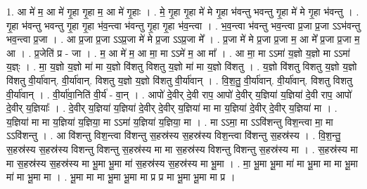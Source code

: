\documentclass[17pt]{extarticle}
\begin{document}
1. आ मे॑ म॒ आ मे॑ गृ॒हा गृ॒हा म॒ आ मे॑ गृ॒हाः । . मे॒ गृ॒हा गृ॒हा मे॑ मे गृ॒हा भ॑वन्तु भवन्तु गृ॒हा मे॑ मे गृ॒हा भ॑वन्तु । . गृ॒हा भ॑वन्तु भवन्तु गृ॒हा गृ॒हा भ॑व॒न्त्वा भ॑वन्तु गृ॒हा गृ॒हा भ॑व॒न्त्वा । . भ॒व॒न्त्वा भ॑वन्तु भव॒न्त्वा प्र॒जा प्र॒जा ऽऽभ॑वन्तु भव॒न्त्वा प्र॒जा । . आ प्र॒जा प्र॒जा ऽऽप्र॒जा मे॑ मे प्र॒जा ऽऽप्र॒जा मे᳚ । . प्र॒जा मे॑ मे प्र॒जा प्र॒जा म॒ आ मे᳚ प्र॒जा प्र॒जा म॒ आ । . प्र॒जेति॑ प्र - जा । . म॒ आ मे॑ म॒ आ मा॒ मा ऽऽमे॑ म॒ आ मा᳚ । . आ मा॒ मा ऽऽमा॑ य॒ज्ञो य॒ज्ञो मा ऽऽमा॑ य॒ज्ञ्ः । . मा॒ य॒ज्ञो य॒ज्ञो मा॑ मा य॒ज्ञो वि॑शतु विशतु य॒ज्ञो मा॑ मा य॒ज्ञो वि॑शतु । . य॒ज्ञो वि॑शतु विशतु य॒ज्ञो य॒ज्ञो वि॑शतु वी॒र्या॑वान्. वी॒र्या॑वान्. विशतु य॒ज्ञो य॒ज्ञो वि॑शतु वी॒र्या॑वान् । . वि॒श॒तु॒ वी॒र्या॑वान्. वी॒र्या॑वान्. विशतु विशतु वी॒र्या॑वान् । . वी॒र्या॑वा॒निति॑ वी॒र्य॑ - वा॒न् । . आपो॑ दे॒वीर् दे॒वी राप॒ आपो॑ दे॒वीर् य॒ज्ञिया॑ य॒ज्ञिया॑ दे॒वी राप॒ आपो॑ दे॒वीर् य॒ज्ञियाः᳚ । . दे॒वीर् य॒ज्ञिया॑ य॒ज्ञिया॑ दे॒वीर् दे॒वीर् य॒ज्ञिया॑ मा मा य॒ज्ञिया॑ दे॒वीर् दे॒वीर् य॒ज्ञिया॑ मा । . य॒ज्ञिया॑ मा मा य॒ज्ञिया॑ य॒ज्ञिया॒ मा ऽऽमा॑ य॒ज्ञिया॑ य॒ज्ञिया॒ मा । . मा ऽऽमा॒ मा ऽऽवि॑शन्तु विश॒न्त्वा मा॒ मा ऽऽवि॑शन्तु । . आ वि॑शन्तु विश॒न्त्वा वि॑शन्तु स॒हस्र॑स्य स॒हस्र॑स्य विश॒न्त्वा वि॑शन्तु स॒हस्र॑स्य । . वि॒श॒न्तु॒ स॒हस्र॑स्य स॒हस्र॑स्य विशन्तु विशन्तु स॒हस्र॑स्य मा मा स॒हस्र॑स्य विशन्तु विशन्तु स॒हस्र॑स्य मा । . स॒हस्र॑स्य मा मा स॒हस्र॑स्य स॒हस्र॑स्य मा भू॒मा भू॒मा मा॑ स॒हस्र॑स्य स॒हस्र॑स्य मा भू॒मा । . मा॒ भू॒मा भू॒मा मा॑ मा भू॒मा मा मा भू॒मा मा॑ मा भू॒मा मा । . भू॒मा मा मा भू॒मा भू॒मा मा प्र प्र मा भू॒मा भू॒मा मा प्र । \newline
\end{document}
